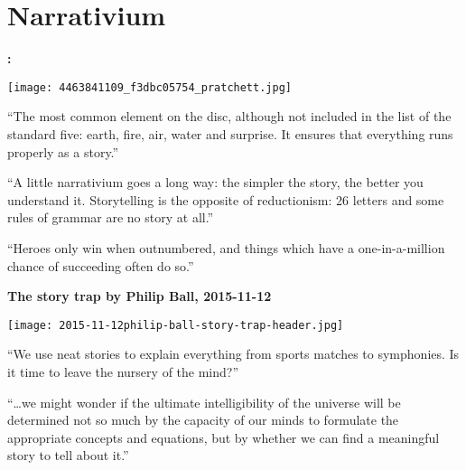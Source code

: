 

\section{Narrativium}
  \small
  \textbf{
    :
  }
    
    
\begin{marginfigure}
  \texttt{[image: 4463841109\_f3dbc05754\_pratchett.jpg]}
\end{marginfigure}
    
        ``The most common element on the disc, although not
        included in the list of the standard five: earth, fire, air,
        water and surprise. It ensures that everything runs properly
        as a story.''
      
        ``A little narrativium goes a long way: the simpler the story,
        the better you understand it. Storytelling is the opposite of
        reductionism: 26 letters and some rules of grammar are no story
        at all.''
  
    
    
      ``Heroes only win when outnumbered, and things which have a
      one-in-a-million chance of succeeding often do so.''
  \footnotesize
  
  \textbf{
      {The story trap} 
      by Philip Ball, 2015-11-12}
      
\begin{marginfigure}
  \texttt{[image: 2015-11-12philip-ball-story-trap-header.jpg]}
\end{marginfigure}
    
    
      ``We use neat stories to explain everything from sports matches
      to symphonies. Is it time to leave the nursery of the mind?''
    
      ``\ldots we might wonder if the ultimate intelligibility of the
      universe will be determined not so much by the capacity of our minds
      to formulate the appropriate concepts and equations, but by whether we
      can find a meaningful story to tell about it.''
  
